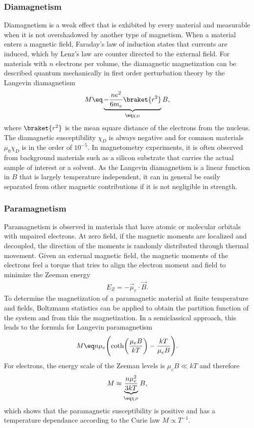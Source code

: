 \documentclass[\main/dresen_thesis.tex]{subfiles}
\begin{document}
  \subsubsection{Diamagnetism}
    Diamagnetism is a weak effect that is exhibited by every material and measurable when it is not overshadowed by another type of magnetism.
    When a material enters a magnetic field, Faraday's law of induction states that currents are induced, which by Lenz's law are counter directed to the external field.
    For materials with $n$ electrons per volume, the diamagnetic magnetization can be described quantum mechanically in first order perturbation theory by the Langevin diamagnetism \cite{Blundell_2001_Magne}
    \begin{align}
      M \eq \underbrace{- \frac{n e^2}{6 m_e} \braket{r^2}}_{\eq \chi_D} B,
    \end{align}
    where $\braket{r^2}$ is the mean square distance of the electrons from the nucleus.
    The diamagnetic susceptibility $\chi_D$ is always negative and for common materials $\mu_0 \chi_D$ is in the order of $10^{-5}$.
    In magnetometry experiments, it is often observed from background materials such as a silicon substrate that carries the actual sample of interest or a solvent.
    As the Langevin diamagnetism is a linear function in $B$ that is largely temperature independent, it can in general be easily separated from other magnetic contributions if it is not negligible in strength.

  \subsubsection{Paramagnetism}
    Paramagnetism is observed in materials that have atomic or molecular orbitals with unpaired electrons.
    At zero field, if the magnetic moments are localized and decoupled, the direction of the moments is randomly distributed through thermal movement.
    Given an external magnetic field, the magnetic moments of the electrons feel a torque that tries to align the electron moment and field to minimize the Zeeman energy
    \begin{align}
      E_Z = - \vec{\mu}_e \cdot \vec{B}.
    \end{align}
    To determine the magnetization of a paramagnetic material at finite temperature and fields, Boltzmann statistics can be applied to obtain the partition function of the system and from this the magnetization.
    In a semiclassical approach, this leads to the formula for Langevin paramagnetism
    \begin{align}
      M \eq n \mu_e \Biggl( \coth \biggl(\frac{\mu_e B}{k T} \biggr) - \frac{k T}{\mu_e B} \Biggr).
    \end{align}
    For electrons, the energy scale of the Zeeman levels is $\mu_e B \ll kT$ and therefore
    \begin{align}
      M \approx \underbrace{\frac{n \mu_e^2}{3kT}}_{\eq \chi_P} B,
    \end{align}
    which shows that the paramagnetic susceptibility is positive and has a temperature dependance according to the Curie law $M \propto T^{-1}$.
\end{document}
